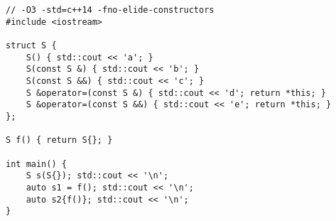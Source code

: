 \begin{lstlisting}[title=\href{https://godbolt.org/z/56x-96}{\texttt{godbolt.org/z/56x-96}}]
// -O3 -std=c++14 -fno-elide-constructors
#include <iostream>

struct S {
    S() { std::cout << 'a'; }
    S(const S &) { std::cout << 'b'; }
    S(const S &&) { std::cout << 'c'; }
    S &operator=(const S &) { std::cout << 'd'; return *this; }
    S &operator=(const S &&) { std::cout << 'e'; return *this; }
};

S f() { return S{}; }

int main() {
    S s(S{}); std::cout << '\n';
    auto s1 = f(); std::cout << '\n';
    auto s2{f()}; std::cout << '\n';    
}
\end{lstlisting}
